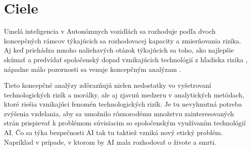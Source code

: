 \documentclass[10pt,oneside,slovak,a4paper]{article}
\begin{document}
\begin{center}
\end{center}


\section{Ciele}
Umelá inteligencia v Autonómnych vozidlách sa rozhoduje podľa dvoch koncepčných rámcov týkajúcich sa rozhodovacej kapacity a zmierňovania rizika. Aj keď prichádza mnoho naliehavých otázok týkajúcich sa toho, ako najlepšie skúmať a predvídať spoločenský dopad vznikajúcich technológií z hľadiska rizika \cite{asveld2009ethics}, nápadne málo pozornosti sa venuje koncepčným analýzam \cite{asveld2009ethics}. \par Tieto koncepčné analýzy zdôrazňujú nielen nedostatky vo vyšetrovaní technologických rizík a morálky, ale aj zjavnú medzeru v analytických metódach, ktoré riešia vznikajúci fenomén technologických rizík. Je tu nevyhnutná potreba zvýšenia vzdelania, aby sa umožnilo rôznorodému množstvu zainteresovaných strán prispievať k problémom súvisiacim so spoločenským využívaním technológií AI. Čo sa týka bezpečnosti AI tak tu taktiež vzniká nový etický problém. Napríklad v prípade, v ktorom by AI mala rozhodovať o živote a smrti.
~\cite{doi:10.1080/08839514.2019.1600301,7368032}






























\end{document}
